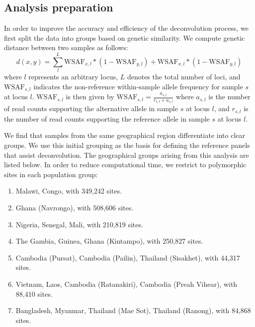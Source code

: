 \documentclass[9pt]{article}
\begin{document}
\subsection{Analysis preparation}
In order to improve the accuracy and efficiency of the deconvolution process, we first split the  data into groups based on genetic similarity. We compute genetic distance between two samples as follows:
\begin{equation}
d(x, y) = \sum_{l}^{L}\textrm{WSAF}_{x,l} * (1-\textrm{WSAF}_{y,l}) + \textrm{WSAF}_{x,l} * (1-\textrm{WSAF}_{y,l})
\end{equation}
where $l$ represents an arbitrary locus, $L$ denotes the total number of loci, and $\textrm{WSAF}_{s,l}$ indicates the non-reference within-sample allele frequency for sample $s$ at locus $l$. $\textrm{WSAF}_{s,l}$ is then given by $\textrm{WSAF}_{s,l} = \frac{a_{s,l}}{r_{s,l}+a_{s,l}}$ where $a_{s,l}$ is the number of read counts supporting the alternative allele in sample $s$ at locus $l$, and $r_{s,l}$ is the number of read counts supporting the reference allele in sample $s$ at locus $l$.

We find that samples from the same geographical region differentiate into clear groups. We use this initial grouping as the basis for defining the reference panels that assist deconvolution. The geographical groups arising from this analysis are listed below. In order to reduce computational time, we restrict to polymorphic sites in each population group:
\begin{enumerate}
  \item Malawi, Congo, with 349,242 sites.
  \item Ghana (Navrongo), with 508,606 sites.
  \item Nigeria, Senegal, Mali, with 210,819 sites.
  \item The Gambia, Guinea, Ghana (Kintampo), with 250,827 sites.
  \item Cambodia (Pursat), Cambodia (Pailin), Thailand (Sisakhet), with 44,317 sites.
  \item Vietnam, Laos, Cambodia (Ratanakiri), Cambodia (Preah Vihear), with 88,410 sites.
  \item Bangladesh, Myanmar, Thailand (Mae Sot), Thailand (Ranong), with 84,868 sites.
\end{enumerate}


\end{document}
